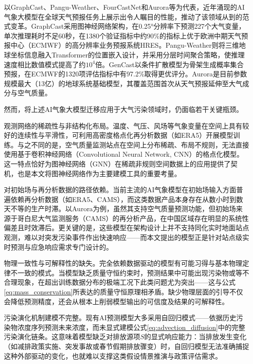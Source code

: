 以GraphCast\citep{lam2023learning}、Pangu-Weather\citep{bi2023accurate}、FourCastNet\citep{pathak2022fourcastnet}和Aurora\citep{bodnar2025foundation}等为代表，近年涌现的AI气象大模型在全球天气预报任务上展示出令人瞩目的性能，推动了该领域从到的范式变革。GraphCast采用图神经网络架构\citep{battaglia2018relational}，在0.25°分辨率下预测227个大气变量，单次推理耗时不足60秒，在1380个验证指标中约90\%的指标上优于欧洲中期天气预报中心（ECMWF）的高分辨率业务预报系统HRES\citep{lam2023learning}。Pangu-Weather则将三维地球坐标信息融入Transformer的位置嵌入设计，并采用分层时间聚合策略，使推理速度相比数值模式提高了约$10^4$倍\citep{bi2023accurate}。GenCast以条件扩散模型为骨架生成概率集合预报，在ECMWF的1320项评估指标中有97.2\%取得更优评分\citep{price2025probabilistic}。Aurora是目前参数规模最大（13亿）的地球系统基础模型，其覆盖范围首次从天气预报延伸至大气成分与空气质量\citep{bodnar2025foundation}。

然而，将上述AI气象大模型迁移应用于大气污染领域时，仍面临若干关键瓶颈。

观测网络的稀疏性与非结构化布局。温度、气压、风场等气象变量在空间上具有较好的连续性与平滑性，可利用高密度格点化再分析数据（如ERA5）开展模型训练。与之不同的是，空气质量监测站点在空间上分布稀疏、布局不规则，无法直接使用基于卷积神经网络（Convolutional Neural Network, CNN）的格点化模型。这一特点恰好为图神经网络（GNN）在稀疏非规则空间数据上的应用提供了契机，也是本文将图神经网络作为主要建模工具的重要考量。

对初始场与再分析数据的路径依赖。当前主流的AI气象模型在初始场输入方面普遍依赖再分析数据（如ERA5、CAMS），而这类数据产品本身存在从数小时到数天不等的生产时滞\citep{kashinath2021physics}。以Aurora为例，虽然其支持空气质量预测功能，但初始场来源于哥白尼大气监测服务（CAMS）的再分析产品，在中国区域存在明显的系统性偏差且时效滞后。更关键的是，这些模型在架构设计上并不支持同化实时地面站点观测，难以对突发污染事件作出快速响应——而本文提出的模型正是针对站点级实时预测与应急响应需求专门设计的。

物理一致性与可解释性的缺失。完全依赖数据驱动的模型有可能习得与基本物理定律不一致的模式\citep{karniadakis2021physics}。当模型缺乏质量守恒约束时，预测结果中可能出现污染物或等不合理现象，在超出训练数据分布的极端工况下此类问题尤为突出——这与公式\eqref{eq:mass_conservation}所表达的质量守恒原理相矛盾。缺少物理层面的引导不仅会降低预测精度，还会从根本上削弱模型输出的可信度及结果的可解释性。

污染演化机制建模不完整。现有AI预测模型大多采用自回归模式——依据历史污染物浓度序列预测未来浓度，而未显式建模公式\eqref{eq:advection_diffusion}中的完整污染演化链条。这意味着模型缺乏对排放源项$S$的显式响应能力：当排放发生变化（如减排政策实施、突发事故或春节假期排放骤变）时，自回归模型无法准确捕捉这种外部驱动的变化，也就难以支撑这类假设情景推演与政策评估需求。

